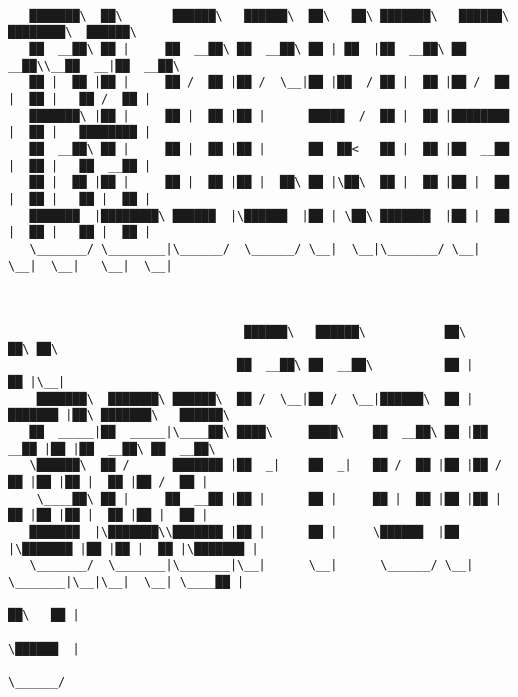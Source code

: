 \documentclass[varwidth=\maxdimen,margin=0.5cm,multi={verbatim}]{standalone}
\begin{document}
\begin{verbatim}

   ███████\  ██\       ██████\   ██████\  ██\   ██\ ███████\   ██████\ ████████\  ██████\
   ██  __██\ ██ |     ██  __██\ ██  __██\ ██ | ██  |██  __██\ ██  __██\\__██  __|██  __██\
   ██ |  ██ |██ |     ██ /  ██ |██ /  \__|██ |██  / ██ |  ██ |██ /  ██ |  ██ |   ██ /  ██ |
   ███████\ |██ |     ██ |  ██ |██ |      █████  /  ██ |  ██ |████████ |  ██ |   ████████ |
   ██  __██\ ██ |     ██ |  ██ |██ |      ██  ██<   ██ |  ██ |██  __██ |  ██ |   ██  __██ |
   ██ |  ██ |██ |     ██ |  ██ |██ |  ██\ ██ |\██\  ██ |  ██ |██ |  ██ |  ██ |   ██ |  ██ |
   ███████  |████████\ ██████  |\██████  |██ | \██\ ███████  |██ |  ██ |  ██ |   ██ |  ██ |
   \_______/ \________|\______/  \______/ \__|  \__|\_______/ \__|  \__|  \__|   \__|  \__|



                                 ██████\   ██████\           ██\       ██\ ██\
                                ██  __██\ ██  __██\          ██ |      ██ |\__|
    ███████\  ███████\ ██████\  ██ /  \__|██ /  \__|██████\  ██ | ███████ |██\ ███████\   ██████\
   ██  _____|██  _____|\____██\ ████\     ████\    ██  __██\ ██ |██  __██ |██ |██  __██\ ██  __██\
   \██████\  ██ /      ███████ |██  _|    ██  _|   ██ /  ██ |██ |██ /  ██ |██ |██ |  ██ |██ /  ██ |
    \____██\ ██ |     ██  __██ |██ |      ██ |     ██ |  ██ |██ |██ |  ██ |██ |██ |  ██ |██ |  ██ |
   ███████  |\███████\\███████ |██ |      ██ |     \██████  |██ |\███████ |██ |██ |  ██ |\███████ |
   \_______/  \_______|\_______|\__|      \__|      \______/ \__| \_______|\__|\__|  \__| \____██ |
                                                                                         ██\   ██ |
                                                                                         \██████  |
                                                                                          \______/



\end{verbatim}
\end{document}
